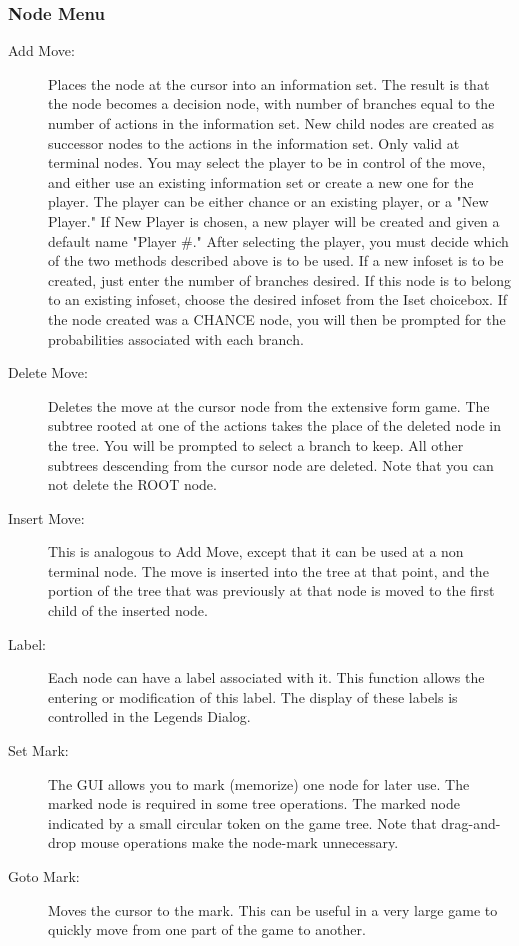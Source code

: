 {\subsubsection{Node Menu}
\begin{description}
\item[Add Move:] Places the node at the cursor into an information set. 
The result is that the node becomes a 
decision node, with number of branches equal to the number of actions in 
the information set.  New child nodes are created as successor nodes 
to the actions in the information set.  Only valid at terminal nodes.  
You may select the player to be in control of 
the move, and either use an existing information 
set or create a new one for the player.  The player can be either
chance or an existing player, or a "New Player."  If New Player is chosen,
a new player will be created and given a default name "Player \#." After
selecting the player, you must decide which of the two methods described
above is to be used.  If a new infoset is to be created, just enter the
number of branches desired.  If this node is to belong to an existing
infoset, choose the desired infoset from the Iset choicebox.  If the node
created was a CHANCE node, you will then be prompted for the probabilities
associated with each branch.
\item[Delete Move:]  
Deletes the move at the cursor node from the extensive form game.  The
subtree rooted at one of the actions takes the place of the deleted 
node in the tree.  You will be prompted to select a branch to keep.  All other 
subtrees descending from the cursor node are deleted.  Note that you can not 
delete the ROOT node.
\item[Insert Move:] This is analogous to Add Move, except that it can be used at a 
non terminal node.  The move is inserted into the tree at that point, 
and the portion of the tree that was previously at that node is moved to 
the first child of the inserted node. 
\item[Label:]  Each node can have a label associated with it. 
This function allows the entering or modification of this label.  The
display of these labels is controlled in the Legends Dialog.
\item[Set Mark:]  The GUI allows you to mark (memorize) one
node for later use.  The marked node is required in some tree operations. 
The marked node indicated by a small circular token 
on the game tree.  Note that drag-and-drop mouse operations make the
node-mark unnecessary.
\item[Goto Mark:]  Moves the cursor to the mark.  This can be useful in a 
very large game to quickly move from one part of the game to another. 
\end{description}

}
